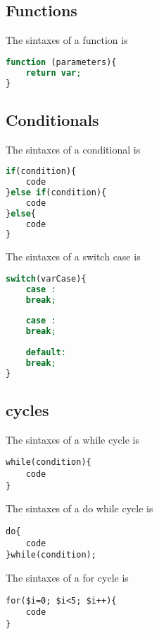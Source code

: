 \subsection{Functions}
The sintaxes of a function is
\begin{lstlisting}[language=PHP]
function (parameters){
    return var;
}
\end{lstlisting}

\subsection{Conditionals}
The sintaxes of a conditional is
\begin{lstlisting}[language=PHP]
if(condition){
    code
}else if(condition){
    code
}else{
    code
}
\end{lstlisting}

The sintaxes of a switch case is

\begin{lstlisting}[language=PHP]
switch(varCase){
    case :
    break;
	
    case :
    break;
	
    default:
    break;
}
\end{lstlisting}

\subsection{cycles}

The sintaxes of a while cycle is

\begin{lstlisting}
while(condition){
    code
}
\end{lstlisting}

The sintaxes of a do while cycle is

\begin{lstlisting}
do{
    code
}while(condition);
\end{lstlisting}

The sintaxes of a for cycle is

\begin{lstlisting}
for($i=0; $i<5; $i++){
    code
}
\end{lstlisting}

